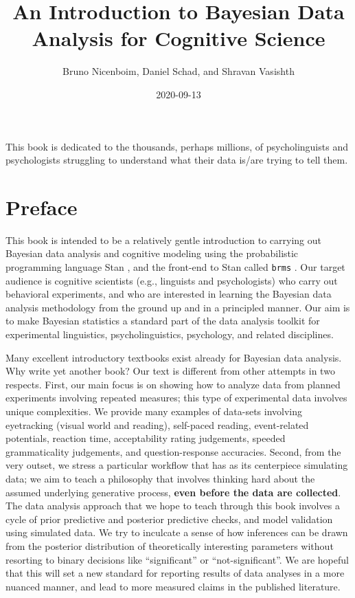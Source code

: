 \documentclass[12pt,]{krantz}
\title{An Introduction to Bayesian Data Analysis for Cognitive Science}
\author{Bruno Nicenboim, Daniel Schad, and Shravan Vasishth}
\date{2020-09-13}
\theoremstyle{definition}
\theoremstyle{definition}
\theoremstyle{definition}
\theoremstyle{remark}
\begin{document}
\maketitle

\thispagestyle{empty}
\begin{center}
This book is dedicated to the thousands, perhaps millions, of psycholinguists and psychologists struggling to understand what their data is/are trying to tell them.
\end{center}

\setlength{\abovedisplayskip}{-5pt}
\setlength{\abovedisplayshortskip}{-5pt}

{
\hypersetup{linkcolor=}
\setcounter{tocdepth}{2}
\tableofcontents
}
\hypertarget{preface}{%
\chapter*{Preface}\label{preface}}


This book is intended to be a relatively gentle introduction to carrying out Bayesian data analysis and cognitive modeling using the probabilistic programming language Stan \citep{carpenter2017stan}, and the front-end to Stan called \texttt{brms} \citep{R-brms}. Our target audience is cognitive scientists (e.g., linguists and psychologists) who carry out behavioral experiments, and who are interested in learning the Bayesian data analysis methodology from the ground up and in a principled manner. Our aim is to make Bayesian statistics a standard part of the data analysis toolkit for experimental linguistics, psycholinguistics, psychology, and related disciplines.

Many excellent introductory textbooks exist already for Bayesian data analysis. Why write yet another book? Our text is different from other attempts in two respects. First, our main focus is on showing how to analyze data from planned experiments involving repeated measures; this type of experimental data involves unique complexities. We provide many examples of data-sets involving eyetracking (visual world and reading), self-paced reading, event-related potentials, reaction time, acceptability rating judgements, speeded grammaticality judgements, and question-response accuracies. Second, from the very outset, we stress a particular workflow that has as its centerpiece simulating data; we aim to teach a philosophy that involves thinking hard about the assumed underlying generative process, \textbf{even before the data are collected}. The data analysis approach that we hope to teach through this book involves a cycle of prior predictive and posterior predictive checks, and model validation using simulated data. We try to inculcate a sense of how inferences can be drawn from the posterior distribution of theoretically interesting parameters without resorting to binary decisions like ``significant'' or ``not-significant''. We are hopeful that this will set a new standard for reporting results of data analyses in a more nuanced manner, and lead to more measured claims in the published literature.
\end{document}
